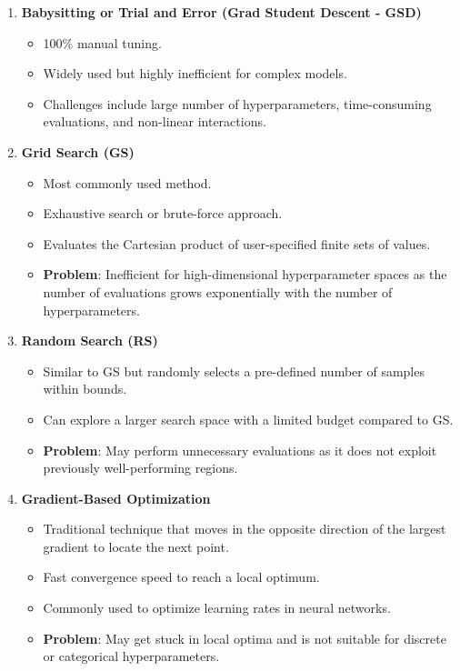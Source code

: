 \documentclass[
  letterpaper,
  DIV=11,
  numbers=noendperiod]{scrreprt}
\providecommand{\tightlist}{%
  \setlength{\itemsep}{0pt}\setlength{\parskip}{0pt}}\usepackage{longtable,booktabs,array}
\begin{document}
\begin{enumerate}
\def\labelenumi{\arabic{enumi}.}
\tightlist
\item
  \textbf{Babysitting or Trial and Error (Grad Student Descent - GSD)}

  \begin{itemize}
  \tightlist
  \item
    100\% manual tuning.
  \item
    Widely used but highly inefficient for complex models.
  \item
    Challenges include large number of hyperparameters, time-consuming
    evaluations, and non-linear interactions.
  \end{itemize}
\item
  \textbf{Grid Search (GS)}

  \begin{itemize}
  \tightlist
  \item
    Most commonly used method.
  \item
    Exhaustive search or brute-force approach.
  \item
    Evaluates the Cartesian product of user-specified finite sets of
    values.
  \item
    \textbf{Problem}: Inefficient for high-dimensional hyperparameter
    spaces as the number of evaluations grows exponentially with the
    number of hyperparameters.
  \end{itemize}
\item
  \textbf{Random Search (RS)}

  \begin{itemize}
  \tightlist
  \item
    Similar to GS but randomly selects a pre-defined number of samples
    within bounds.
  \item
    Can explore a larger search space with a limited budget compared to
    GS.
  \item
    \textbf{Problem}: May perform unnecessary evaluations as it does not
    exploit previously well-performing regions.
  \end{itemize}
\item
  \textbf{Gradient-Based Optimization}

  \begin{itemize}
  \tightlist
  \item
    Traditional technique that moves in the opposite direction of the
    largest gradient to locate the next point.
  \item
    Fast convergence speed to reach a local optimum.
  \item
    Commonly used to optimize learning rates in neural networks.
  \item
    \textbf{Problem}: May get stuck in local optima and is not suitable
    for discrete or categorical hyperparameters.
  \end{itemize}
\end{enumerate}
\end{document}
